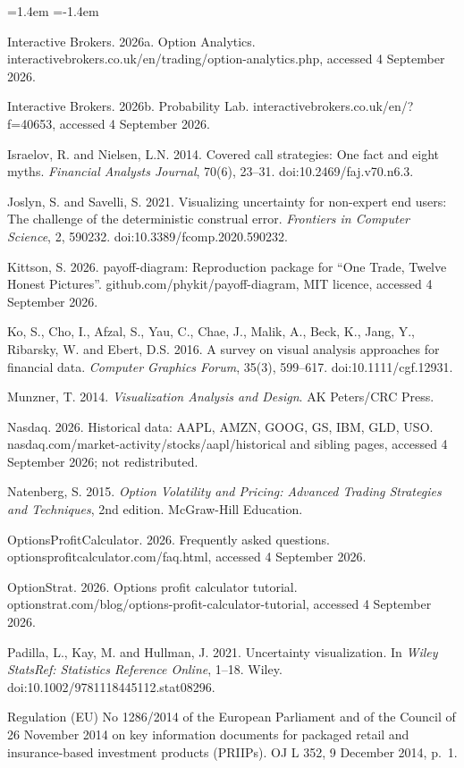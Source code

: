 \documentclass[11pt,a4paper]{article}
\begin{document}
\begin{list}{}{\leftmargin=1.4em \itemindent=-1.4em \itemsep=4pt \topsep=6pt}
\item Interactive Brokers. 2026a. Option Analytics. interactivebrokers.co.uk/en/trading/option-analytics.php, accessed 4 September 2026.
\item Interactive Brokers. 2026b. Probability Lab. interactivebrokers.co.uk/en/?f=40653, accessed 4 September 2026.
\item Israelov, R. and Nielsen, L.N. 2014. Covered call strategies: One fact and eight myths. \emph{Financial Analysts Journal}, 70(6), 23--31. doi:10.2469/faj.v70.n6.3.
\item Joslyn, S. and Savelli, S. 2021. Visualizing uncertainty for non-expert end users: The challenge of the deterministic construal error. \emph{Frontiers in Computer Science}, 2, 590232. doi:10.3389/fcomp.2020.590232.
\item Kittson, S. 2026. payoff-diagram: Reproduction package for ``One Trade, Twelve Honest Pictures''. github.com/phykit/payoff-diagram, MIT licence, accessed 4 September 2026.
\item Ko, S., Cho, I., Afzal, S., Yau, C., Chae, J., Malik, A., Beck, K., Jang, Y., Ribarsky, W. and Ebert, D.S. 2016. A survey on visual analysis approaches for financial data. \emph{Computer Graphics Forum}, 35(3), 599--617. doi:10.1111/cgf.12931.
\item Munzner, T. 2014. \emph{Visualization Analysis and Design}. AK Peters/CRC Press.
\item Nasdaq. 2026. Historical data: AAPL, AMZN, GOOG, GS, IBM, GLD, USO. nasdaq.com/market-activity/stocks/aapl/historical and sibling pages, accessed 4 September 2026; not redistributed.
\item Natenberg, S. 2015. \emph{Option Volatility and Pricing: Advanced Trading Strategies and Techniques}, 2nd edition. McGraw-Hill Education.
\item OptionsProfitCalculator. 2026. Frequently asked questions. optionsprofitcalculator.com/faq.html, accessed 4 September 2026.
\item OptionStrat. 2026. Options profit calculator tutorial. optionstrat.com/blog/options-profit-calculator-tutorial, accessed 4 September 2026.
\item Padilla, L., Kay, M. and Hullman, J. 2021. Uncertainty visualization. In \emph{Wiley StatsRef: Statistics Reference Online}, 1--18. Wiley. doi:10.1002/9781118445112.stat08296.
\item Regulation (EU) No 1286/2014 of the European Parliament and of the Council of 26 November 2014 on key information documents for packaged retail and insurance-based investment products (PRIIPs). OJ L 352, 9 December 2014, p.~1.

\end{list}
\end{document}
